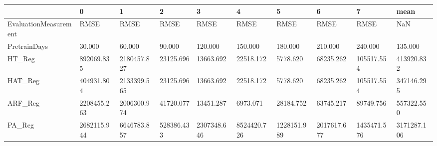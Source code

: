 \begin{tabular}{llllllllll}
\toprule
{} &           0 &           1 &          2 &           3 &           4 &           5 &           6 &           7 &        mean \\
\midrule
EvaluationMeasurement &        RMSE &        RMSE &       RMSE &        RMSE &        RMSE &        RMSE &        RMSE &        RMSE &         NaN \\
PretrainDays          &      30.000 &      60.000 &     90.000 &     120.000 &     150.000 &     180.000 &     210.000 &     240.000 &     135.000 \\
HT\_Reg                &  892069.835 & 2180457.827 &  23125.696 &   13663.692 &   22518.172 &    5778.620 &   68235.262 &  105517.554 &  413920.832 \\
HAT\_Reg               &  404931.804 & 2133399.565 &  23125.696 &   13663.692 &   22518.172 &    5778.620 &   68235.262 &  105517.554 &  347146.295 \\
ARF\_Reg               & 2208455.263 & 2006300.974 &  41720.077 &   13451.287 &    6973.071 &   28184.752 &   63745.217 &   89749.756 &  557322.550 \\
PA\_Reg                & 2682115.944 & 6646783.857 & 528386.433 & 2307348.646 & 8524420.726 & 1228151.989 & 2017617.677 & 1435471.576 & 3171287.106 \\
\bottomrule
\end{tabular}
